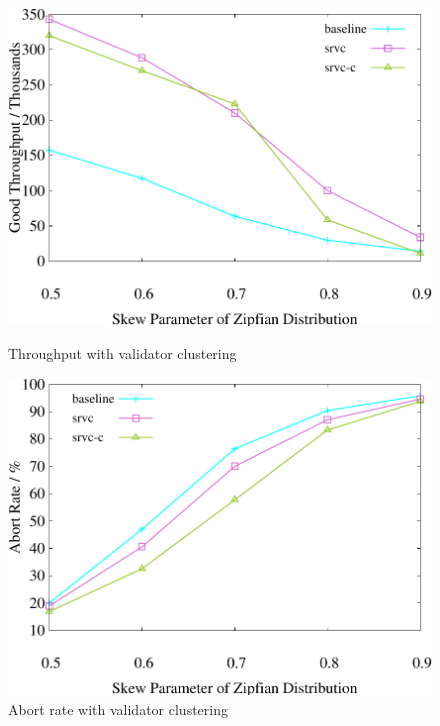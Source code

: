 \begin{figure}[t]
    \centering
    \begin{minipage}[b]{0.32\linewidth}
        \centering
        \includegraphics[width=\textwidth]{./exp_fig/cluster/tps}
        \vspace{-2em}
        \caption{Throughput with validator clustering}
        \label{fig:cluster:tps}
    \end{minipage}
    \begin{minipage}[b]{0.32\linewidth}
        \centering
        \includegraphics[width=\textwidth]{./exp_fig/cluster/abort}
        \vspace{-2em}
        \caption{Abort rate with validator clustering}
        \label{fig:cluster:abort}

\end{minipage}
\end{figure}
